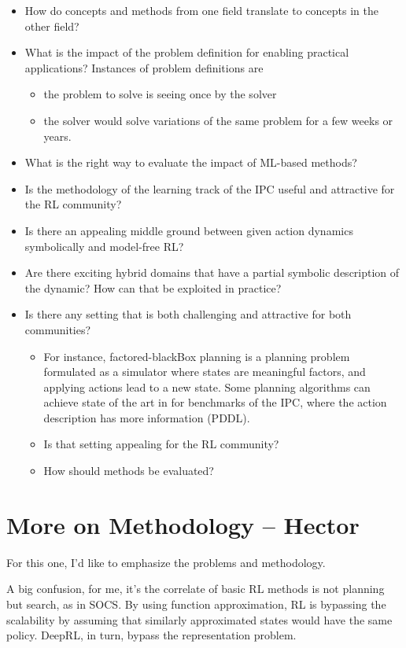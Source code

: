 \documentclass[10pt]{article}
\begin{document}
\begin{itemize}
\item How do concepts and methods from one field translate to concepts in the other field?
\item What is the impact of the problem definition for enabling practical applications? Instances of problem definitions are
\begin{itemize}
\item the problem to solve is seeing once by the solver
\item the solver would solve variations of the same problem for a few weeks or years.
\end{itemize}
\item What is the right way to evaluate the impact of ML-based methods? 
\item Is the methodology of the learning track of the IPC useful and attractive for the RL community?
\item Is there an appealing middle ground between given action dynamics symbolically and model-free RL? 
\item Are there exciting hybrid domains that have a partial symbolic description of the dynamic? How can that be exploited in practice?
\item Is there any setting that is both challenging and attractive for both communities? 
\begin{itemize}
\item For instance, factored-blackBox planning is a planning problem formulated as a simulator where states are meaningful factors, and applying actions lead to a new state. Some planning algorithms can achieve state of the art in for benchmarks of the IPC, where the action description has more information (PDDL). 
\item Is that setting appealing for the RL community?
\item How should methods be evaluated?
\end{itemize}
\end{itemize}


\section*{More on Methodology – Hector}

For this one, I'd like to emphasize the problems and methodology.

A big confusion, for me, it's the correlate of basic RL methods is not planning but search, as in SOCS.
By using function approximation, RL is bypassing the scalability
by assuming that similarly approximated states would have the same policy.
DeepRL, in turn, bypass the representation problem.
\end{document}
